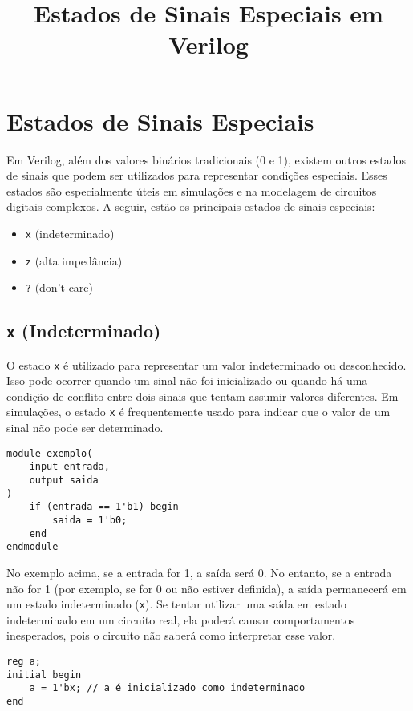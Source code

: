 \documentclass{article}
\title{Estados de Sinais Especiais em Verilog}
\author{}
\date{}
\begin{document}
\maketitle

\section*{Estados de Sinais Especiais}

Em Verilog, além dos valores binários tradicionais (0 e 1), existem outros estados de sinais que podem ser utilizados para representar condições especiais. Esses estados são especialmente úteis em simulações e na modelagem de circuitos digitais complexos. A seguir, estão os principais estados de sinais especiais:

\begin{itemize}
    \item \texttt{x} (indeterminado)
    \item \texttt{z} (alta impedância)
    \item \texttt{?} (don't care)
\end{itemize}

\subsection*{\texttt{x} (Indeterminado)}
O estado \texttt{x} é utilizado para representar um valor indeterminado ou desconhecido. Isso pode ocorrer quando um sinal não foi inicializado ou quando há uma condição de conflito entre dois sinais que tentam assumir valores diferentes. Em simulações, o estado \texttt{x} é frequentemente usado para indicar que o valor de um sinal não pode ser determinado.

\begin{lstlisting}
module exemplo(
    input entrada,
    output saida
)
    if (entrada == 1'b1) begin
        saida = 1'b0;
    end
endmodule
\end{lstlisting}

No exemplo acima, se a entrada for 1, a saída será 0. No entanto, se a entrada não for 1 (por exemplo, se for 0 ou não estiver definida), a saída permanecerá em um estado indeterminado (\texttt{x}). Se tentar utilizar uma saída em estado indeterminado em um circuito real, ela poderá causar comportamentos inesperados, pois o circuito não saberá como interpretar esse valor.

\begin{lstlisting}
reg a;
initial begin
    a = 1'bx; // a é inicializado como indeterminado
end
\end{lstlisting}
\end{document}

